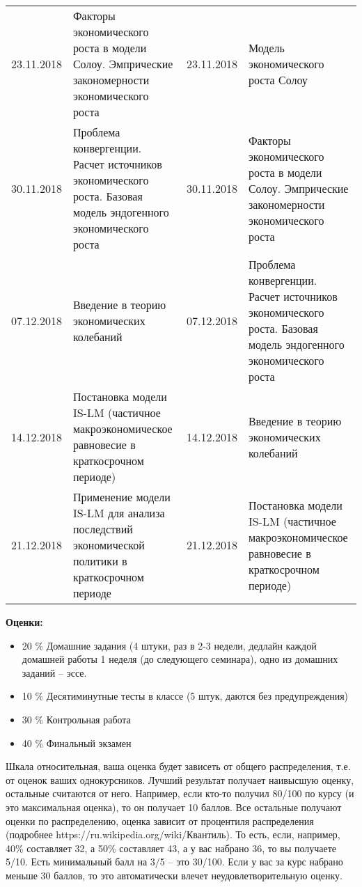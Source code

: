 \documentclass[11pt, a4paper]{article}
\begin{document}
\begin{longtable} {|p{1.6cm}|p{7cm}|p{1.6cm}|p{7cm}|}
23.11.2018&	Факторы экономического роста в модели Солоу. Эмпрические закономерности экономического роста&	23.11.2018&	Модель экономического роста Солоу\\
30.11.2018&	Проблема конвергенции. Расчет источников экономического роста. Базовая модель эндогенного экономического роста&	30.11.2018&	Факторы экономического роста в модели Солоу. Эмпрические закономерности экономического роста \\
07.12.2018&	Введение в теорию экономических колебаний&	07.12.2018&	Проблема конвергенции. Расчет источников экономического роста. Базовая модель эндогенного экономического роста \\
14.12.2018&	Постановка модели IS-LM (частичное макроэкономическое равновесие в краткосрочном периоде)&	14.12.2018&	Введение в теорию экономических колебаний\\
21.12.2018&	Применение модели IS-LM для анализа последствий экономической политики в краткосрочном периоде&	21.12.2018&	Постановка модели IS-LM (частичное макроэкономическое равновесие в краткосрочном периоде)\\
\hline
\end{longtable}


\newpage
\noindent\textbf{Оценки:}  
\begin{itemize}
\item 20 \% Домашние задания (4 штуки, раз в 2-3 недели, дедлайн каждой домашней работы 1 неделя (до следующего семинара), одно из домашних заданий -- эссе. 
\item 10 \% Десятиминутные тесты в классе (5 штук, даются без предупреждения)
\item  30 \% Контрольная работа 
\item 40 \% Финальный экзамен  
\end{itemize}

Шкала относительная, ваша оценка будет зависеть от общего распределения, т.е. от оценок ваших однокурсников. Лучший результат получает наивысшую оценку, остальные считаются от него. Например, если кто-то получил 80/100 по курсу (и это максимальная оценка), то он получает 10 баллов. Все остальные получают оценки по распределению, оценка зависит от процентиля распределения (подробнее https://ru.wikipedia.org/wiki/Квантиль). То есть, если, например, 40\% составляет 32, а 50\% составляет 43, а у вас набрано 36, то вы получаете 5/10. Есть минимальный балл на 3/5 -- это 30/100. Если у вас за курс набрано меньше 30 баллов, то это автоматически влечет неудовлетворительную оценку.
\end{document}
